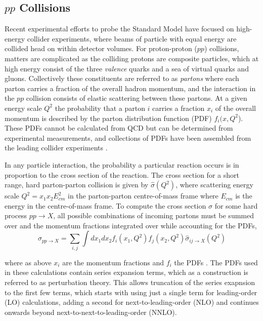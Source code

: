 	\subsection{$pp$ Collisions}
	\label{t:ppc}
	Recent experimental efforts to probe the Standard Model have focused on high-energy collider experiments, where beams of particle with equal energy are collided head on within detector volumes.  For proton-proton ($pp$) collisions, matters are complicated as the colliding protons are composite particles, which at high energy consist of the three \textit{valence} quarks and a sea of virtual quarks and gluons. Collectively these constituents are referred to as \textit{partons} where each parton carries a fraction of the overall hadron momentum, and the interaction in the $pp$ collision consists of elastic scattering between these partons. At a given energy scale $Q^2$ the probability that a parton $i$ carries a fraction $x_i$ of the overall momentum is described by the parton distribution function (PDF) $f_i(x, Q^2$). These PDFs cannot be calculated from QCD but can be determined from experimental measurements, and collections of PDFs have been assembled from the leading collider experiments \cite{hardinteractions, pdfs}.

	In any particle interaction, the probability a particular reaction occurs is in proportion to the cross section of the reaction. The cross section for a short range, hard parton-parton collision is given by $\hat{\sigma}(Q^2)$, where scattering energy scale $Q^2 = x_1x_2E^2_{cm}$ in the parton-parton centre-of-mass frame where $E_{cm}$ is the energy in the centre-of-mass frame. To compute the cross section $\sigma$ for some hard process $pp\rightarrow X$, all possible combinations of incoming partons must be summed over and the momentum fractions integrated over while accounting for the PDFs,
	\begin{equation}
	\label{eq:hard}
	\sigma_{pp\rightarrow X} = \sum_{i, j} \int dx_1dx_2f_i(x_1, Q^2)f_j(x_2, Q^2)\hat{\sigma}_{ij\rightarrow X}(Q^2)
	\end{equation}

	where as above $x_i$ are the momentum fractions and $f_i$ the PDFs \cite{hardinteractions}. The PDFs used in these calculations contain series expansion terms, which as a construction is referred to as perturbation theory. This allows truncation of the series exapnsion to the first few terms, which starts with using just a single term for leading-order (LO) calculations, adding a second for next-to-leading-order (NLO) and continues onwards beyond next-to-next-to-leading-order (NNLO)\cite{hardinteractions}.
